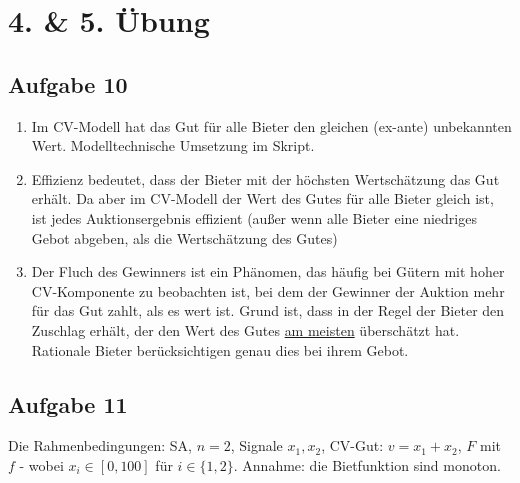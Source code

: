 \documentclass[12pt]{extreport} %
\theoremstyle{named}
\theoremstyle{nnamed}
\theoremstyle{itshape}
\theoremstyle{normal}
\begin{document}
\section*{4. \& 5. Übung}

\subsection*{Aufgabe 10}

\begin{enumerate}[label=\alph*\upshape)]
	\item Im CV-Modell hat das Gut für alle Bieter den gleichen (ex-ante) unbekannten Wert. Modelltechnische Umsetzung im Skript.
	\item Effizienz bedeutet, dass der Bieter mit der höchsten Wertschätzung das Gut erhält. Da aber im CV-Modell der Wert des Gutes für alle Bieter gleich ist, ist jedes Auktionsergebnis effizient (außer wenn alle Bieter eine niedriges Gebot abgeben, als die Wertschätzung des Gutes)
	\item Der Fluch des Gewinners ist ein Phänomen, das häufig bei Gütern mit hoher CV-Komponente zu beobachten ist, bei dem der Gewinner der Auktion mehr für das Gut zahlt, als es wert ist. Grund ist, dass in der Regel der Bieter den Zuschlag erhält, der den Wert des Gutes \underline{am meisten} überschätzt hat. ~\\
		Rationale Bieter berücksichtigen genau dies bei ihrem Gebot.
\end{enumerate}

\subsection*{Aufgabe 11}

Die Rahmenbedingungen: SA, $n = 2$, Signale $x_1, x_2$, CV-Gut: $v = x_1 + x_2$, $F$ mit $f$ - wobei $x_{i} \in [0, 100]$ für $i \in \{1, 2 \}$. Annahme: die Bietfunktion sind monoton.
\end{document}
